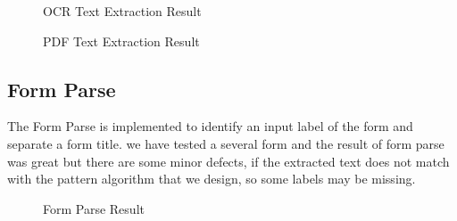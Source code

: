 \documentclass[12pt,oneside,openright,a4paper]{cpe-english-project}
\begin{document}
\begin{figure}[H]
\centering
{}
\caption{OCR Text Extraction Result}\label{fig:ocr-result}
\end{figure}

\begin{figure}[H]
\centering
{}
\caption{PDF Text Extraction Result}\label{fig:pdf-result}
\end{figure}

\subsection{Form Parse}
The Form Parse is implemented to identify an input label of the form and separate a form title. we have tested a several form and the result of form parse was 
great but there are some minor defects, if the extracted text does not match with the pattern algorithm that we design, so some labels may be missing.

\begin{figure}[H]
\centering
{}
\caption{Form Parse Result}\label{fig:Form-Parse}
\end{figure}
\end{document}
